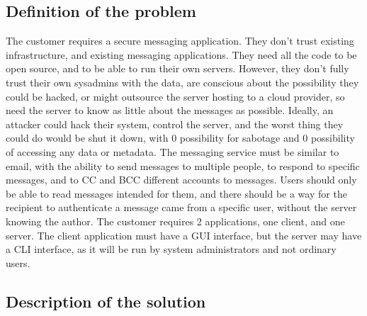 \documentclass{article}
\begin{document}
\subsection{Definition of the problem}
The customer requires a secure messaging application. They don't trust existing infrastructure, and existing messaging applications. They need all the code to be open source, and to be able to run their own servers. However, they don't fully trust their own sysadmins with the data, are conscious about the possibility they could be hacked, or might outsource the server hosting to a cloud provider, so need the server to know as little about the messages as possible. Ideally, an attacker could hack their system, control the server, and the worst thing they could do would be shut it down, with 0 possibility for sabotage and 0 possibility of accessing any data or metadata. The messaging service must be similar to email, with the ability to send messages to multiple people, to respond to specific messages, and to CC and BCC different accounts to messages. Users should only be able to read messages intended for them, and there should be a way for the recipient to authenticate a message came from a specific user, without the server knowing the author. The customer requires 2 applications, one client, and one server. The client application must have a GUI interface, but the server may have a CLI interface, as it will be run by system administrators and not ordinary users.\\
\subsection{Description of the solution}
\end{document}
